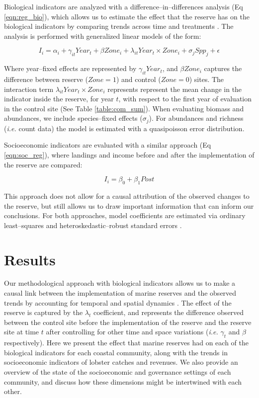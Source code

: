 \documentclass{frontiersSCNS}
\theoremstyle{definition}
\theoremstyle{definition}
\theoremstyle{definition}
\theoremstyle{remark}
\begin{document}
Biological indicators are analyzed with a difference--in--differences
analysis (Eq \ref{eqn:reg_bio}), which allows us to estimate the effect
that the reserve has on the biological indicators by comparing trends
across time and treatments
\citep{moland_2013-VP,Villasenor-Derbez_2018}. The analysis is performed
with generalized linear models of the form:

\begin{equation}
I_i = \alpha_{i} + \gamma_{it} Year_t + \beta Zone_i + \lambda_{it} Year_t\times Zone_i + \sigma_jSpp_j + \epsilon
\label{eqn:reg_bio}
\end{equation}

Where year--fixed effects are represented by \(\gamma_{it} Year_t\), and
\(\beta Zone_i\) captures the difference between reserve (\(Zone = 1\))
and control (\(Zone = 0\)) sites. The interaction term
\(\lambda_{it} Year_t\times Zone_i\) represents represent the mean
change in the indicator inside the reserve, for year \(t\), with respect
to the first year of evaluation in the control site (See Table
\ref{table:com_sum}). When evaluating biomass and abundances, we include
species--fixed effects (\(\sigma_j\)). For abundances and richness
(\emph{i.e.} count data) the model is estimated with a quasipoisson
error distribution.

Socioeconomic indicators are evaluated with a similar approach (Eq
\ref{eqn:soc_reg}), where landings and income before and after the
implementation of the reserve are compared:

\begin{equation}
I_i = \beta_0 + \beta_1Post
\label{eqn:soc_reg}
\end{equation}

This approach does not allow for a causal attribution of the observed
changes to the reserve, but still allows us to draw important
information that can inform our conclusions. For both approaches, model
coefficients are estimated via ordinary least--squares and
heteroskedastic--robust standard errors \citep{zeileis_2004-7n}.

\section{Results}\label{results}

Our methodological approach with biological indicators allows us to make
a causal link between the implementation of marine reserves and the
observed trends by accounting for temporal and spatial dynamics
\citep{depalma_2018}. The effect of the reserve is captured by the
\(\lambda_t\) coefficient, and represents the difference observed
between the control site before the implementation of the reserve and
the reserve site at time \(t\) after controlling for other time and
space variations (\emph{i.e.} \(\gamma_t\) and \(\beta\) respectively).
Here we present the effect that marine reserves had on each of the
biological indicators for each coastal community, along with the trends
in socioeconomic indicators of lobster catches and revenues. We also
provide an overview of the state of the socioeconomic and governance
settings of each community, and discuss how these dimensions might be
intertwined with each other.
\end{document}
